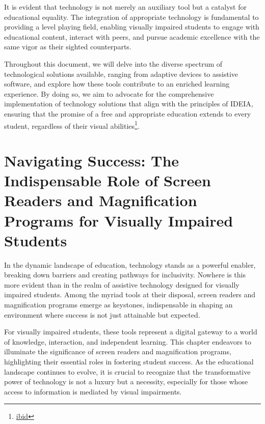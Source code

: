 \documentclass[14pt,letterpaper,twoside]{extreport}
\begin{document}
It is evident that technology is not merely an auxiliary tool but a catalyst for educational equality. The integration of appropriate technology is fundamental to providing a level playing field, enabling visually impaired students to engage with educational content, interact with peers, and pursue academic excellence with the same vigor as their sighted counterparts.

 Throughout this document, we will delve into the diverse spectrum of technological solutions available, ranging from adaptive devices to assistive software, and explore how these tools contribute to an enriched learning experience. By doing so, we aim to advocate for the comprehensive implementation of technology solutions that align with the principles of IDEIA, ensuring that the promise of a free and appropriate education extends to every student, regardless of their visual abilities\footnote{\href{https://sites.ed.gov/idea/statuteregulations/}{ibid}}.

\pagebreak
\fancyhead[RO]{\lastxmark}
\fancyhead[LE]{\firstxmark}
\fancyfoot[C]{}

\hypertarget{vision-assistive-technology-laptop-computer-requirements}{}\chapter[Navigating Success: The Indispensable Role of Screen Readers and Magnification Programs for Visually Impaired Students]{Navigating Success: The Indispensable Role of Screen Readers and Magnification Programs for Visually Impaired Students}\label{vision-assistive-technology-laptop-computer-requirements} 


In the dynamic landscape of education, technology stands as a powerful enabler, breaking down barriers and creating pathways for inclusivity. Nowhere is this more evident than in the realm of assistive technology designed for visually impaired students. Among the myriad tools at their disposal, screen readers and magnification programs emerge as keystones, indispensable in shaping an environment where success is not just attainable but expected.

For visually impaired students, these tools represent a digital gateway to a world of knowledge, interaction, and independent learning. This chapter endeavors to illuminate the significance of screen readers and magnification programs, highlighting their essential roles in fostering student success. As the educational landscape continues to evolve, it is crucial to recognize that the transformative power of technology is not a luxury but a necessity, especially for those whose access to information is mediated by visual impairments.
\end{document}
